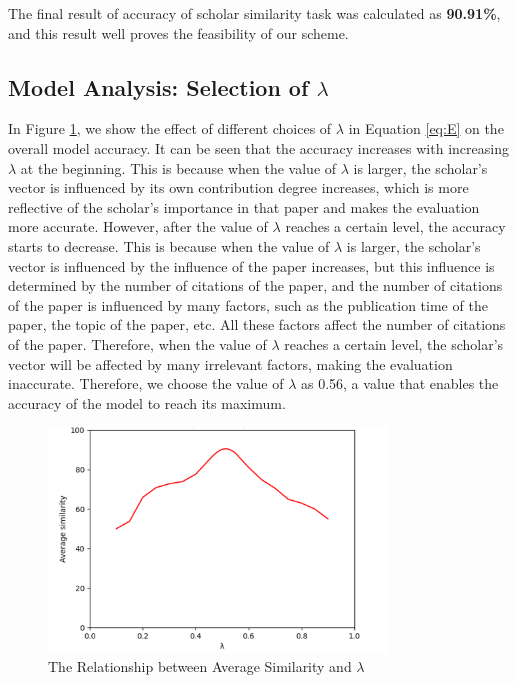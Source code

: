 \documentclass[conference]{IEEEtran}
\begin{document}
The final result of accuracy of scholar similarity task was calculated as
\textbf{90.91\%}, and this result well proves the feasibility of our
scheme.

\subsection{Model Analysis: Selection of $\lambda$}
In Figure \ref{Average}, we show the effect of different choices of $\lambda$ in Equation \ref{eq:E} on the overall model accuracy. 
It can be seen that the accuracy increases with increasing
\(\lambda\) at the beginning. This is because when the value of
\(\lambda\) is larger, the scholar's vector is influenced by its own
contribution degree increases, which is more reflective of the scholar's
importance in that paper and makes the evaluation more accurate.
However, after the value of \(\lambda\) reaches a certain level, the
accuracy starts to decrease. This is because when the value of
\(\lambda\) is larger, the scholar's vector is influenced by the
influence of the paper increases, but this influence is determined
by the number of citations of the paper, and the number of citations of
the paper is influenced by many factors, such as the publication time of
the paper, the topic of the paper, etc. All these factors affect the
number of citations of the paper. Therefore, when the value of
\(\lambda\) reaches a certain level, the scholar's vector will be
affected by many irrelevant factors, making the evaluation inaccurate.
Therefore, we choose the value of \(\lambda\) as 0.56, a value that
enables the accuracy of the model to reach its maximum.

\begin{figure}[htbp] %
\centering %
\includegraphics[width=9cm]{img/Aver.png}
\caption{The Relationship between Average Similarity and $\lambda$} %
\label{Average} %
\end{figure}
\end{document}
